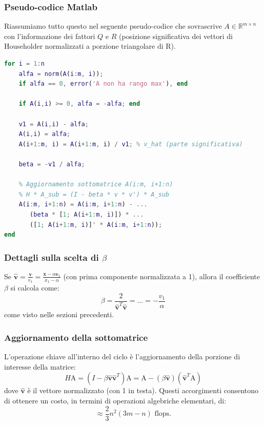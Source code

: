 \subsubsection{Pseudo-codice Matlab}
Riassumiamo tutto questo nel seguente pseudo-codice che sovrascrive $A \in \mathbb{R}^{m \times n}$ con l'informazione dei fattori $Q$ e $R$ (posizione significativa dei vettori di Householder normalizzati a porzione triangolare di R).

\begin{lstlisting}[language=Matlab, frame=none, numbers=none]
for i = 1:n
    alfa = norm(A(i:m, i));
    if alfa == 0, error('A non ha rango max'), end
    
    if A(i,i) >= 0, alfa = -alfa; end
    
    v1 = A(i,i) - alfa;
    A(i,i) = alfa;
    A(i+1:m, i) = A(i+1:m, i) / v1; % v_hat (parte significativa)
    
    beta = -v1 / alfa;
    
    % Aggiornamento sottomatrice A(i:m, i+1:n)
    % H * A_sub = (I - beta * v * v') * A_sub
    A(i:m, i+1:n) = A(i:m, i+1:n) - ...
       (beta * [1; A(i+1:m, i)]) * ...
       ([1; A(i+1:m, i)]' * A(i:m, i+1:n));
end
\end{lstlisting}





\subsubsection*{Dettagli sulla scelta di $\beta$}
Se $\hat{\mathbf{v}} = \frac{\mathbf{v}}{v_1} = \frac{\mathbf{x} - \alpha \mathbf{e}_1}{x_1 - \alpha}$ (con prima componente normalizzata a 1), allora il coefficiente $\beta$ si calcola come:
$$ \beta = \frac{2}{\hat{\mathbf{v}}^T \hat{\mathbf{v}}} = \dots = -\frac{v_1}{\alpha} $$
come visto nelle sezioni precedenti.

\subsubsection*{Aggiornamento della sottomatrice}
L'operazione chiave all'interno del ciclo è l'aggiornamento della porzione di interesse della matrice:
$$ H \text{A} = (I - \beta \hat{\mathbf{v}} \hat{\mathbf{v}}^T) \text{A} = \text{A} - (\beta \hat{\mathbf{v}}) (\hat{\mathbf{v}}^T \text{A}) $$
dove $\hat{\mathbf{v}}$ è il vettore normalizzato (con 1 in testa).
Questi accorgimenti consentono di ottenere un costo, in termini di operazioni algebriche elementari, di:
$$ \approx \frac{2}{3}n^2(3m - n) \text{ flops}. $$

